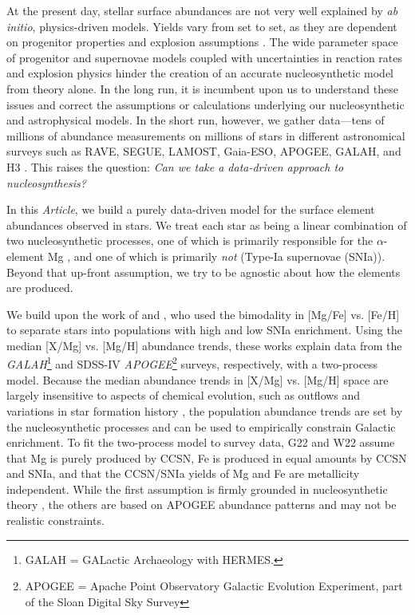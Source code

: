 \documentclass[modern]{aastex631}
\newcommand{\documentname}{\textsl{Article}}
\begin{document}
At the present day, stellar surface abundances are not very well explained by \textsl{ab initio}, physics-driven models.
Yields vary from set to set, as they are dependent on progenitor properties and explosion assumptions \citep[e.g.,][]{rybizki2017, griffith2021b}. 
The wide parameter space of progenitor and supernovae models coupled with uncertainties in reaction rates and explosion physics hinder the creation of an accurate nucleosynthetic model from theory alone.
In the long run, it is incumbent upon us to understand these issues and correct the assumptions or calculations underlying our nucleosynthetic and astrophysical models.
In the short run, however, we gather data---tens of millions of abundance measurements on millions of stars in different astronomical surveys such as RAVE, SEGUE, LAMOST, Gaia-ESO, APOGEE, GALAH, and H3 \citep{steinmetz2006, yanny2009, gilmore2012, desilva2015, luo2015, majewski2017, conroy2019}.
This raises the question: \emph{Can we take a data-driven approach to nucleosynthesis?}

In this \documentname{}, we build a purely data-driven model for the surface element abundances observed in stars.
We treat each star as being a linear combination of two nucleosynthetic processes, one of which is primarily responsible for the $\alpha$-element Mg \citep[core collapse supernovae (CCSN), e.g.][]{andrews2017}, and one of which is primarily \emph{not} (Type-Ia supernovae (SNIa)).
Beyond that up-front assumption, we try to be agnostic about how the elements are produced.

We build upon the work of \citet[][hereafter G22]{griffith2019, griffith2022} and \citet[][hereafter W22]{weinberg2019, weinberg2022}, who used the bimodality in [Mg/Fe] vs. [Fe/H] \citep[e.g.,][]{fuhrmann1998, bensby2003, adibekyan2012} to separate stars into populations with high and low SNIa enrichment. Using the median [X/Mg] vs. [Mg/H] abundance trends, these works explain data from the \textsl{GALAH}\footnote{GALAH = GALactic Archaeology with HERMES.} and SDSS-IV \textsl{APOGEE}\footnote{APOGEE = Apache Point Observatory Galactic Evolution Experiment, part of the Sloan Digital Sky Survey} surveys, respectively, with a two-process model. Because the median abundance trends in [X/Mg] vs. [Mg/H] space are largely insensitive to aspects of chemical evolution, such as outflows and variations in star formation history \citep{weinberg2019}, the population abundance trends are set by the nucleosynthetic processes and can be used to empirically constrain Galactic enrichment. To fit the two-process model to survey data, G22 and W22 assume that Mg is purely produced by CCSN, Fe is produced in equal amounts by CCSN and SNIa, and that the CCSN/SNIa yields of Mg and Fe are metallicity independent. While the first assumption is firmly grounded in nucleosynthetic theory \citep[e.g.,][]{andrews2017, rybizki2017}, the others are based on APOGEE abundance patterns and may not be realistic constraints.
\end{document}
